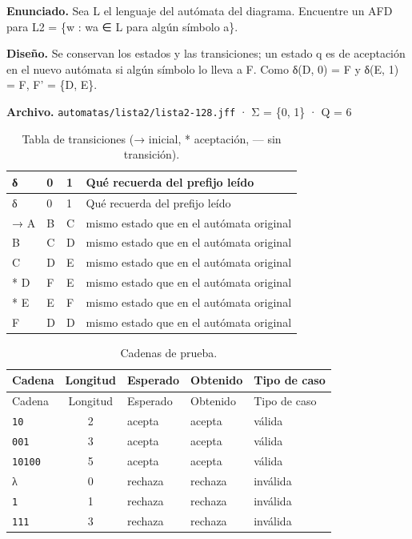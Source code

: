\textbf{Enunciado.} Sea L el lenguaje del autómata del diagrama. Encuentre un AFD para L2 = \{w : wa ∈ L para algún símbolo a\}.

\textbf{Diseño.} Se conservan los estados y las transiciones; un estado q es de aceptación en el nuevo autómata si algún símbolo lo lleva a F. Como δ(D, 0) = F y δ(E, 1) = F, F' = \{D, E\}.

\textbf{Archivo.} \texttt{automatas/lista2/lista2-128.jff} · Σ = \{0, 1\} · \textbar Q\textbar{} = 6

\begin{longtable}[]{@{}llll@{}}
\caption{Tabla de transiciones (→ inicial, * aceptación, --- sin transición).}\tabularnewline
\toprule\noalign{}
δ & 0 & 1 & Qué recuerda del prefijo leído \\
\midrule\noalign{}
\endfirsthead
\toprule\noalign{}
δ & 0 & 1 & Qué recuerda del prefijo leído \\
\midrule\noalign{}
\endhead
\bottomrule\noalign{}
\endlastfoot
→ A & B & C & mismo estado que en el autómata original \\
B & C & D & mismo estado que en el autómata original \\
C & D & E & mismo estado que en el autómata original \\
* D & F & E & mismo estado que en el autómata original \\
* E & E & F & mismo estado que en el autómata original \\
F & D & D & mismo estado que en el autómata original \\
\end{longtable}

\begin{longtable}[]{@{}lclll@{}}
\caption{Cadenas de prueba.}\tabularnewline
\toprule\noalign{}
Cadena & Longitud & Esperado & Obtenido & Tipo de caso \\
\midrule\noalign{}
\endfirsthead
\toprule\noalign{}
Cadena & Longitud & Esperado & Obtenido & Tipo de caso \\
\midrule\noalign{}
\endhead
\bottomrule\noalign{}
\endlastfoot
\texttt{10} & 2 & acepta & acepta & válida \\
\texttt{001} & 3 & acepta & acepta & válida \\
\texttt{10100} & 5 & acepta & acepta & válida \\
λ & 0 & rechaza & rechaza & inválida \\
\texttt{1} & 1 & rechaza & rechaza & inválida \\
\texttt{111} & 3 & rechaza & rechaza & inválida \\
\end{longtable}

